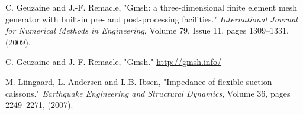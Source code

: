 \documentclass[a4]{article}
\begin{document}
\FloatBarrier

\begin{thebibliography}{99}
	
	 C. Geuzaine and J.-F. Remacle, "Gmsh: a three-dimensional finite element mesh generator with built-in pre- and post-processing facilities." \textit{International Journal for Numerical Methods in Engineering}, Volume 79, Issue 11, pages 1309--1331, (2009).
	
	 C. Geuzaine and J.-F. Remacle, "Gmsh." \url{http://gmsh.info/}
	
	 M. Liingaard, L. Andersen and L.B. Ibsen, "Impedance of flexible suction caissons." \textit{Earthquake Engineering and Structural Dynamics}, Volume 36, pages 2249--2271, (2007).

\end{thebibliography}
\end{document}
